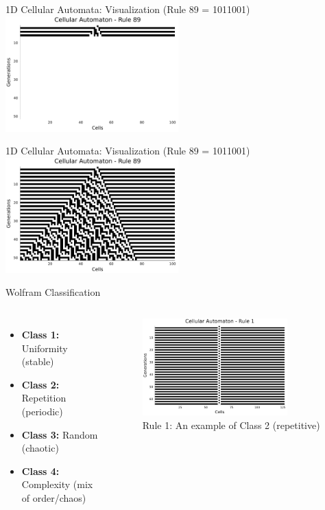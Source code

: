 \begin{frame}{1D Cellular Automata: Visualization (Rule 89 = 1011001)}
    \centering
    \includegraphics[width=0.5\textwidth]{../paper/figures/carule89_step5}
\end{frame}

\begin{frame}{1D Cellular Automata: Visualization (Rule 89 = 1011001)}
    \centering
    \includegraphics[width=0.5\textwidth]{../paper/figures/carule89}

\end{frame}


\begin{frame}{Wolfram Classification}
    \begin{columns}
        \begin{itemize}
            \item \textbf{Class 1:} Uniformity (stable)
            \item \textbf{Class 2:} Repetition (periodic)
            \item \textbf{Class 3:} Random (chaotic)
            \item \textbf{Class 4:} Complexity (mix of order/chaos)
        \end{itemize}
        \begin{figure}
            \centering
            \includegraphics[width=0.8\textwidth]{../paper/figures/rule1.png}
            \caption{Rule 1: An example of Class 2 (repetitive)}
        \end{figure}
    \end{columns}
\end{frame}


